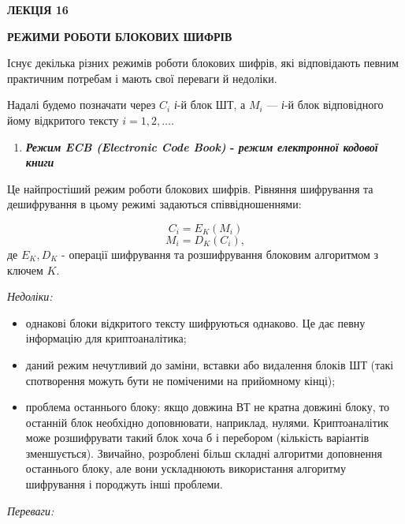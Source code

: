 \bigskip


\bigskip


\bigskip

{\bfseries
ЛЕКЦІЯ  16}


\bigskip

{\centering\bfseries
РЕЖИМИ РОБОТИ БЛОКОВИХ ШИФРІВ
\par}


\bigskip


\bigskip

Існує декілька різних режимів роботи блокових шифрів, які відповідають певним
практичним потребам і мають свої переваги й недоліки.

Надалі будемо позначати через  ${C_{{i}}}$ \textit{і}{}-й блок ШТ, а 
${M_{{i}}}$ --- \textit{і}{}-й блок відповідного йому відкритого тексту 
${i=1,2,\dots}$.


\bigskip


\bigskip

\liststyleWWviiiNumxxi
\begin{enumerate}
\item {\centering\bfseries
\textit{Режим }\textit{ECB (Electronic Code Book) }{}- \textit{режим електронної
кодової книги}
\par}
\end{enumerate}

\bigskip

Це найпростіший режим роботи блокових шифрів. Рівняння шифрування та
дешифрування в цьому режимі  задаються співвідношеннями:

\begin{equation*}
{C_{{i}}=E_{{K}}(M_{{i}})}
\end{equation*}
\begin{equation*}
{M_{{i}}=D_{{K}}(C_{{i}}),}
\end{equation*}
де  ${E_{{K}},D_{{K}}}$ - операції шифрування та розшифрування блоковим
алгоритмом з ключем  ${K}$.

{\itshape
Недоліки:}

\liststyleWWviiiNumxv
\begin{itemize}
\item однакові блоки відкритого тексту шифруються однаково. Це дає певну
інформацію для криптоаналітика;
\item даний режим нечутливий до заміни, вставки або видалення блоків ШТ (такі
спотворення можуть бути не поміченими на прийомному кінці);
\item проблема останнього блоку: якщо довжина ВТ не кратна довжині блоку, то
останній блок необхідно доповнювати, наприклад, нулями. Криптоаналітик може
розшифрувати такий блок хоча б і перебором (кількість варіантів зменшується).
Звичайно, розроблені більш складні алгоритми доповнення останнього блоку, але
вони ускладнюють використання алгоритму шифрування і породжуть інші проблеми.
\end{itemize}
{\itshape
Переваги:}

